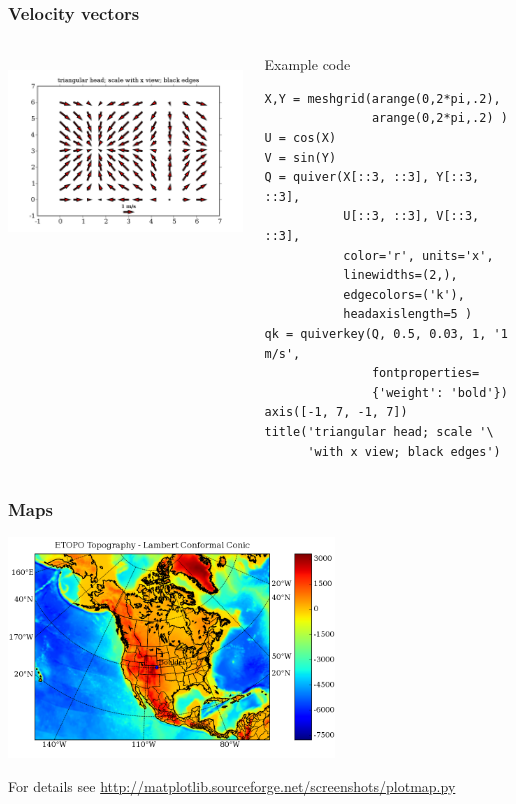 \documentclass[14pt,compress]{beamer}
\begin{document}
\begin{frame}[fragile] \frametitle{Velocity vectors}
  \begin{columns}
    \hspace*{-0.5in}
  \includegraphics[height=2in, interpolate=true]{data/quiver}  
    \begin{block}{Example code}
    \tiny
\begin{lstlisting}
X,Y = meshgrid(arange(0,2*pi,.2),
               arange(0,2*pi,.2) )
U = cos(X)
V = sin(Y)
Q = quiver(X[::3, ::3], Y[::3, ::3], 
           U[::3, ::3], V[::3, ::3],
           color='r', units='x', 
           linewidths=(2,), 
           edgecolors=('k'), 
           headaxislength=5 )
qk = quiverkey(Q, 0.5, 0.03, 1, '1 m/s', 
               fontproperties=
               {'weight': 'bold'})
axis([-1, 7, -1, 7])
title('triangular head; scale '\
      'with x view; black edges')
\end{lstlisting}
  \end{block}
\end{columns}
\end{frame}

\begin{frame}[fragile] \frametitle{Maps}
  \includegraphics[height=2.3in, interpolate=true]{data/plotmap}  
  \begin{center}
    \tiny
    For details see \url{http://matplotlib.sourceforge.net/screenshots/plotmap.py}
  \end{center}
\end{frame}
\end{document}
